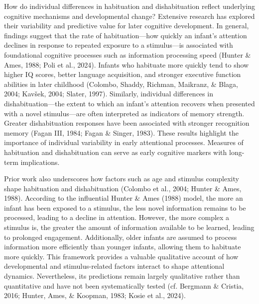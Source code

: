 \documentclass[10pt, letterpaper]{article}
\begin{document}
How do individual differences in habituation and dishabituation reflect
underlying cognitive mechanisms and developmental change? Extensive
research has explored their variability and predictive value for later
cognitive development. In general, findings suggest that the rate of
habituation---how quickly an infant's attention declines in response to
repeated exposure to a stimulus---is associated with foundational
cognitive processes such as information processing speed (Hunter \&
Ames, 1988; Poli et al., 2024). Infants who habituate more quickly tend
to show higher IQ scores, better language acquisition, and stronger
executive function abilities in later childhood (Colombo, Shaddy,
Richman, Maikranz, \& Blaga, 2004; Kavšek, 2004; Slater, 1997).
Similarly, individual differences in dishabituation---the extent to
which an infant's attention recovers when presented with a novel
stimulus---are often interpreted as indicators of memory strength.
Greater dishabituation responses have been associated with stronger
recognition memory (Fagan III, 1984; Fagan \& Singer, 1983). These
results highlight the importance of individual variability in early
attentional processes. Measures of habituation and dishabituation can
serve as early cognitive markers with long-term implications.

Prior work also underscores how factors such as age and stimulus
complexity shape habituation and dishabituation (Colombo et al., 2004;
Hunter \& Ames, 1988). According to the influential Hunter \& Ames
(1988) model, the more an infant has been exposed to a stimulus, the
less novel information remains to be processed, leading to a decline in
attention. However, the more complex a stimulus is, the greater the
amount of information available to be learned, leading to prolonged
engagement. Additionally, older infants are assumed to process
information more efficiently than younger infants, allowing them to
habituate more quickly. This framework provides a valuable qualitative
account of how developmental and stimulus-related factors interact to
shape attentional dynamics. Nevertheless, its predictions remain largely
qualitative rather than quantitative and have not been systematically
tested (cf. Bergmann \& Cristia, 2016; Hunter, Ames, \& Koopman, 1983;
Kosie et al., 2024).
\end{document}
